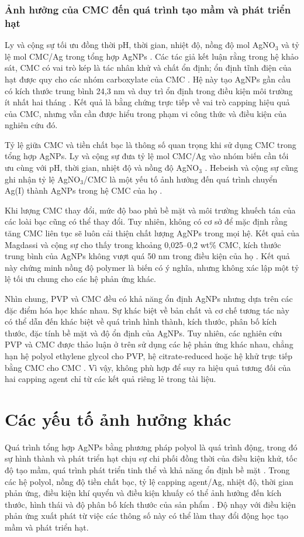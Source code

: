 \subsubsection{Ảnh hưởng của CMC đến quá trình tạo mầm và phát triển hạt}
Ly và cộng sự tối ưu đồng thời pH, thời gian, nhiệt độ, nồng độ mol AgNO$_3$ và tỷ lệ mol CMC/Ag trong tổng hợp AgNPs \parencite{ly2024}.
Các tác giả kết luận rằng trong hệ khảo sát, CMC có vai trò kép là tác nhân khử và chất ổn định; ổn định tĩnh điện của hạt được quy cho các nhóm carboxylate của CMC \parencite{ly2024}.
Hệ này tạo AgNPs gần cầu có kích thước trung bình 24,3 nm và duy trì ổn định trong điều kiện môi trường ít nhất hai tháng \parencite{ly2024}.
Kết quả là bằng chứng trực tiếp về vai trò capping hiệu quả của CMC, nhưng vẫn cần được hiểu trong phạm vi công thức và điều kiện của nghiên cứu đó.
\par
Tỷ lệ giữa CMC và tiền chất bạc là thông số quan trọng khi sử dụng CMC trong tổng hợp AgNPs.
Ly và cộng sự đưa tỷ lệ mol CMC/Ag vào nhóm biến cần tối ưu cùng với pH, thời gian, nhiệt độ và nồng độ AgNO$_3$ \parencite{ly2024}.
Hebeish và cộng sự cũng ghi nhận tỷ lệ AgNO$_3$/CMC là một yếu tố ảnh hưởng đến quá trình chuyển Ag(I) thành AgNPs trong hệ CMC của họ \parencite{hebeish2010}.
\par
Khi lượng CMC thay đổi, mức độ bao phủ bề mặt và môi trường khuếch tán của các loài bạc cũng có thể thay đổi.
Tuy nhiên, không có cơ sở để mặc định rằng tăng CMC liên tục sẽ luôn cải thiện chất lượng AgNPs trong mọi hệ.
Kết quả của Magdassi và cộng sự cho thấy trong khoảng 0,025--0,2 wt\% CMC, kích thước trung bình của AgNPs không vượt quá 50 nm trong điều kiện của họ \parencite{magdassi2003}.
Kết quả này chứng minh nồng độ polymer là biến có ý nghĩa, nhưng không xác lập một tỷ lệ tối ưu chung cho các hệ phản ứng khác.
\par
Nhìn chung, PVP và CMC đều có khả năng ổn định AgNPs nhưng dựa trên các đặc điểm hóa học khác nhau.
Sự khác biệt về bản chất và cơ chế tương tác này có thể dẫn đến khác biệt về quá trình hình thành, kích thước, phân bố kích thước, đặc tính bề mặt và độ ổn định của AgNPs.
Tuy nhiên, các nghiên cứu PVP và CMC được thảo luận ở trên sử dụng các hệ phản ứng khác nhau, chẳng hạn hệ polyol ethylene glycol cho PVP, hệ citrate-reduced hoặc hệ khử trực tiếp bằng CMC cho CMC \parencite{sunxia2002,wiley2005,magdassi2003,hebeish2010,ly2024}.
Vì vậy, không phù hợp để suy ra hiệu quả tương đối của hai capping agent chỉ từ các kết quả riêng lẻ trong tài liệu.
\section{Các yếu tố ảnh hưởng khác}
Quá trình tổng hợp AgNPs bằng phương pháp polyol là quá trình động, trong đó sự hình thành và phát triển hạt chịu sự chi phối đồng thời của điều kiện khử, tốc độ tạo mầm, quá trình phát triển tinh thể và khả năng ổn định bề mặt \parencite{ammar2020,canning2025}.
Trong các hệ polyol, nồng độ tiền chất bạc, tỷ lệ capping agent/Ag, nhiệt độ, thời gian phản ứng, điều kiện khí quyển và điều kiện khuấy có thể ảnh hưởng đến kích thước, hình thái và độ phân bố kích thước của sản phẩm \parencite{hemmati2020,kim2006}.
Độ nhạy với điều kiện phản ứng xuất phát từ việc các thông số này có thể làm thay đổi động học tạo mầm và phát triển hạt.
